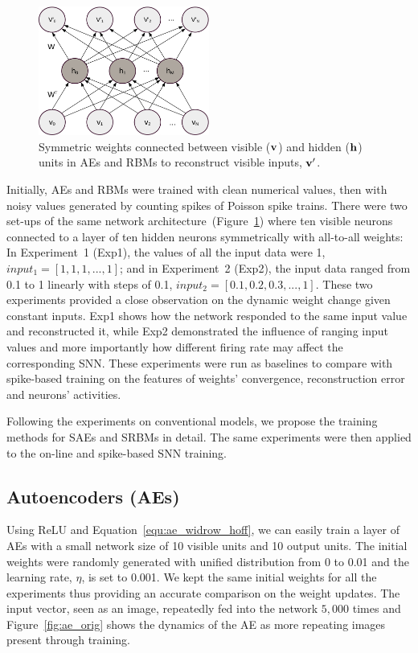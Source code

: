 \begin{figure}
	\centering
	\includegraphics[width=0.5\textwidth]{pics_sdlm/AE.pdf}
	\caption{Symmetric weights connected between visible ($\bf{v}$) and hidden ($\bf{h}$) units in AEs and RBMs to reconstruct visible inputs, $\bf{v'}$.}
	\label{fig:sym_conn}
\end{figure}
Initially, AEs and RBMs were trained with clean numerical values, then with noisy values generated by counting spikes of Poisson spike trains.
There were two set-ups of the same network architecture~(Figure~\ref{fig:sym_conn}) where ten visible neurons connected to a layer of ten hidden neurons symmetrically with all-to-all weights: In Experiment~1 (Exp1), the values of all the input data were 1, $input_1 = [1, 1, 1,...,1]$; and in Experiment~2 (Exp2), the input data ranged from 0.1 to 1 linearly with steps of 0.1, $input_2 = [0.1, 0.2, 0.3,...,1]$.
These two experiments provided a close observation on the dynamic weight change given constant inputs.
Exp1 shows how the network responded to the same input value and reconstructed it, while Exp2 demonstrated the influence of ranging input values and more importantly how different firing rate may affect the corresponding SNN.
These experiments were run as baselines to compare with spike-based training on the features of weights' convergence, reconstruction error and neurons' activities.

Following the experiments on conventional models, we propose the training methods for SAEs and SRBMs in detail.
The same experiments were then applied to the on-line and spike-based SNN training.

\subsection{Autoencoders (AEs)}
\label{sec:ae}
Using ReLU and Equation~\ref{equ:ae_widrow_hoff}, we can easily train a layer of AEs with a small network size of 10 visible units and 10 output units.
The initial weights were randomly generated with unified distribution from 0 to 0.01 and the learning rate, $\eta$, is set to 0.001.
We kept the same initial weights for all the experiments thus providing an accurate comparison on the weight updates.
The input vector, seen as an image, repeatedly fed into the network $5,000$ times and Figure~\ref{fig:ae_orig} shows the dynamics of the AE as more repeating images present through training.


